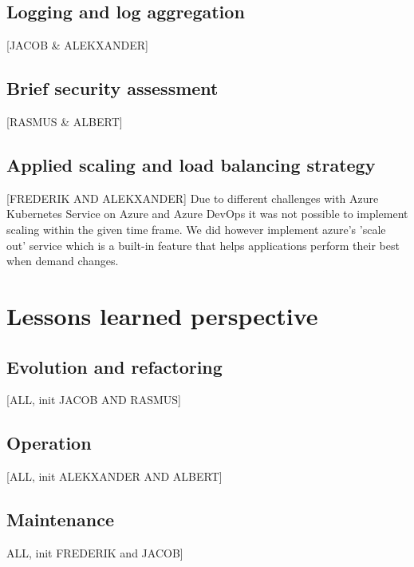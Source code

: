 \documentclass{article}
\begin{document}
\subsection{Logging and log aggregation} [JACOB & ALEKXANDER]
\subsection{Brief security assessment} [RASMUS & ALBERT]
\subsection{Applied scaling and load balancing strategy} [FREDERIK AND ALEKXANDER]
Due to different challenges with Azure Kubernetes Service on Azure and Azure DevOps it was not possible to implement scaling within the given time frame. We did however implement azure's 'scale out' service which is a built-in feature that helps applications perform their best when demand changes.  %

\section{Lessons learned perspective}
\subsection{Evolution and refactoring} [ALL, init JACOB AND RASMUS]
\subsection{Operation} [ALL, init ALEKXANDER AND ALBERT]
\subsection{Maintenance} ALL, init FREDERIK and JACOB]





\end{document}
